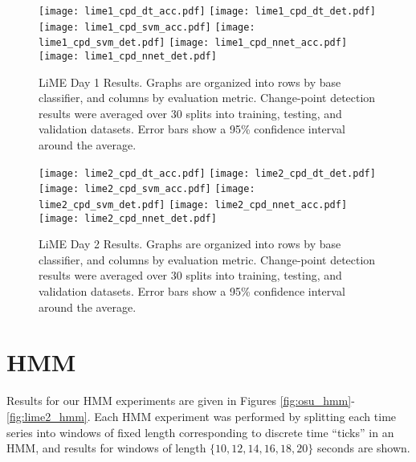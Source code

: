 \begin{figure}[H]
 \centering
 \texttt{[image: lime1\_cpd\_dt\_acc.pdf]} \hspace{1em}\vspace{1em}
 \texttt{[image: lime1\_cpd\_dt\_det.pdf]}
 \texttt{[image: lime1\_cpd\_svm\_acc.pdf]} \hspace{1em}\vspace{1em}
 \texttt{[image: lime1\_cpd\_svm\_det.pdf]}
 \texttt{[image: lime1\_cpd\_nnet\_acc.pdf]} \hspace{1em}
 \texttt{[image: lime1\_cpd\_nnet\_det.pdf]}
 \caption{LiME Day 1 Results. Graphs are organized into rows by base classifier,
  and columns by evaluation metric. Change-point detection results were averaged over
  30 splits into training, testing, and validation datasets. Error bars show a
  95\% confidence interval around the average.}
 \label{fig:lime1_cpd}
\end{figure}

\begin{figure}[H]
 \centering
 \texttt{[image: lime2\_cpd\_dt\_acc.pdf]} \hspace{1em}\vspace{1em}
 \texttt{[image: lime2\_cpd\_dt\_det.pdf]}
 \texttt{[image: lime2\_cpd\_svm\_acc.pdf]} \hspace{1em}\vspace{1em}
 \texttt{[image: lime2\_cpd\_svm\_det.pdf]}
 \texttt{[image: lime2\_cpd\_nnet\_acc.pdf]} \hspace{1em}
 \texttt{[image: lime2\_cpd\_nnet\_det.pdf]}
 \caption{LiME Day 2 Results. Graphs are organized into rows by base classifier,
  and columns by evaluation metric. Change-point detection results were averaged over
  30 splits into training, testing, and validation datasets. Error bars show a
  95\% confidence interval around the average.}
 \label{fig:lime2_cpd}
\end{figure}


\section{HMM}

Results for our HMM experiments are given in
Figures \ref{fig:osu_hmm}-\ref{fig:lime2_hmm}. Each HMM experiment was
performed by splitting each time series into windows of fixed length
corresponding to discrete time ``ticks'' in an HMM,
and results for windows of length $\{10, 12, 14, 16, 18, 20\}$
seconds are shown.

